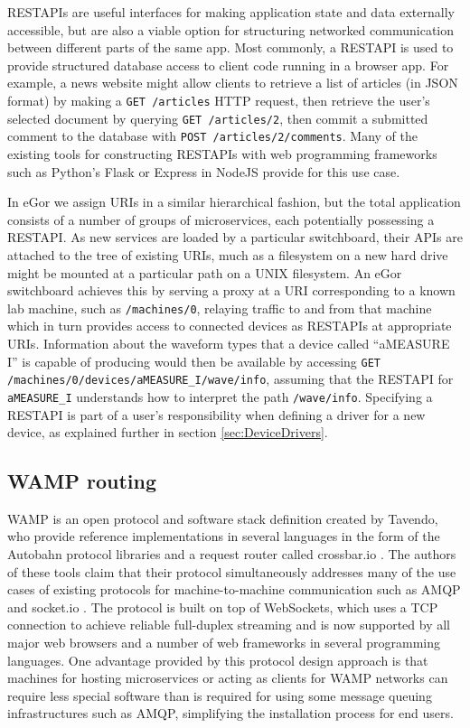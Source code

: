 \documentclass[../thesis]{subfiles}
\begin{document}
\glspl{RESTAPI} are useful interfaces for making application state and
data externally accessible, but are also a viable option for
structuring networked communication between different parts of the
same app. Most commonly, a \gls{RESTAPI} is used to provide structured
database access to client code running in a browser app. For example,
a news website might allow clients to retrieve a list of articles (in
\gls{JSON} format) by making a \texttt{GET /articles} HTTP request,
then retrieve the user's selected document by querying \texttt{GET
  /articles/2}, then commit a submitted comment to the database with
\texttt{POST /articles/2/comments}. Many of the existing tools for
constructing \glspl{RESTAPI} with web programming frameworks such as
Python's Flask \cite{Flask} or Express in NodeJS \cite{Express}
provide for this use case.

In eGor we assign URIs in a similar hierarchical fashion, but the
total application consists of a number of groups of microservices,
each potentially possessing a \gls{RESTAPI}. As new services are
loaded by a particular switchboard, their \glspl{API} are attached to
the tree of existing \glspl{URI}, much as a filesystem on a new hard
drive might be mounted at a particular path on a UNIX filesystem.  An
eGor switchboard achieves this by serving a proxy at a \gls{URI}
corresponding to a known lab machine, such as \texttt{/machines/0},
relaying traffic to and from that machine which in turn provides
access to connected devices as \glspl{RESTAPI} at appropriate
\glspl{URI}. Information about the waveform types that a device called
``aMEASURE I'' is capable of producing would then be available by
accessing \texttt{GET /machines/0/devices/aMEASURE\_I/wave/info},
assuming that the \gls{RESTAPI} for \texttt{aMEASURE\_I} understands
how to interpret the path \texttt{/wave/info}. Specifying a
\gls{RESTAPI} is part of a user's responsibility when defining a
driver for a new device, as explained further in section
\ref{sec:DeviceDrivers}.

\subsection{WAMP routing}
\gls{WAMP} is an open protocol and software stack definition created
by Tavendo, who provide reference implementations in several languages
in the form of the Autobahn protocol libraries and a request router
called crossbar.io \cite{CrossbarIO}. The authors of these tools claim
that their protocol simultaneously addresses many of the use cases of
existing protocols for machine-to-machine communication such as
\gls{AMQP} and socket.io \cite{socketio}. The protocol is built on
top of WebSockets, which uses a TCP connection to achieve reliable
full-duplex streaming and is now supported by all major web browsers
and a number of web frameworks in several programming languages. One
advantage provided by this protocol design approach is that machines
for hosting microservices or acting as clients for \gls{WAMP} networks
can require less special software than is required for using some
message queuing infrastructures such as \gls{AMQP}, simplifying the
installation process for end users.
\end{document}
